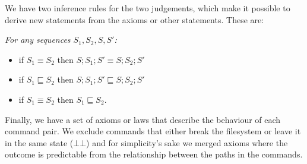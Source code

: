 \documentclass[12pt]{article}
\newcommand{\empt}{\bot}
\newcommand{\fscommand}[2]{{#1#2}}
\newcommand{\fsregcommandchar}[1]{\mathtt{#1}}
\newcommand{\fsregcommand}[2]{\fscommand{\fsregcommandchar{#1}}{\fsregcommandchar{#2}}}
\newcommand{\cbb}{\fsregcommand{\empt}{\empt}}
\newcommand{\eqext}{\sqsubseteq}
\begin{document}
We have two inference rules for the two judgements,
which make it possible to derive new statements from the axioms or other statements.
These are:

\emph{For any sequences \(S_1, S_2, S, S'\):}
\begin{itemize}
\item if \(S_1\equiv S_2\) then \(S;S_1;S'\equiv S;S_2;S'\)
\item if \(S_1\eqext S_2\) then \(S;S_1;S'\eqext S;S_2;S'\)
\item if \(S_1\equiv S_2\) then \(S_1\eqext S_2\).
\end{itemize}

Finally, we have a set of axioms or laws that describe the behaviour
of each command pair. We exclude commands that either break the
filesystem or leave it in the same state ($\cbb$) and for
simplicity's sake we merged axioms where the outcome is predictable
from the relationship between the paths in the commands.
\end{document}
